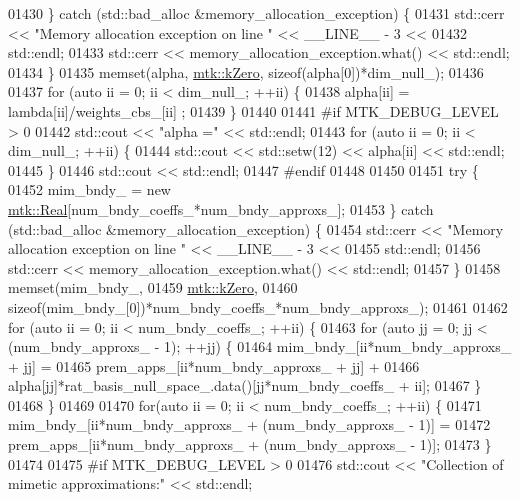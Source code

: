 \begin{DoxyCode}
{{01430   \} \textcolor{keywordflow}{catch} (std::bad\_alloc &memory\_allocation\_exception) \{
01431     std::cerr << \textcolor{stringliteral}{"Memory allocation exception on line "} << \_\_LINE\_\_ - 3 <<
01432       std::endl;
01433     std::cerr << memory\_allocation\_exception.what() << std::endl;
01434   \}
01435   memset(alpha, \hyperlink{group__c01-roots_ga59a451a5fae30d59649bcda274fea271}{mtk::kZero}, \textcolor{keyword}{sizeof}(alpha[0])*dim\_null\_);
01436 
01437   \textcolor{keywordflow}{for} (\textcolor{keyword}{auto} ii = 0; ii < dim\_null\_; ++ii) \{
01438     alpha[ii] = lambda[ii]/weights\_cbs\_[ii] ;
01439   \}
01440 
01441 \textcolor{preprocessor}{  #if MTK\_DEBUG\_LEVEL > 0}
01442   std::cout << \textcolor{stringliteral}{"alpha ="} << std::endl;
01443   \textcolor{keywordflow}{for} (\textcolor{keyword}{auto} ii = 0; ii < dim\_null\_; ++ii) \{
01444     std::cout << std::setw(12) << alpha[ii] << std::endl;
01445   \}
01446   std::cout << std::endl;
01447 \textcolor{preprocessor}{  #endif}
01448 
01450 
01451   \textcolor{keywordflow}{try} \{
01452     mim\_bndy\_ = \textcolor{keyword}{new} \hyperlink{group__c01-roots_gac080bbbf5cbb5502c9f00405f894857d}{mtk::Real}[num\_bndy\_coeffs\_*num\_bndy\_approxs\_];
01453   \} \textcolor{keywordflow}{catch} (std::bad\_alloc &memory\_allocation\_exception) \{
01454     std::cerr << \textcolor{stringliteral}{"Memory allocation exception on line "} << \_\_LINE\_\_ - 3 <<
01455       std::endl;
01456     std::cerr << memory\_allocation\_exception.what() << std::endl;
01457   \}
01458   memset(mim\_bndy\_,
01459          \hyperlink{group__c01-roots_ga59a451a5fae30d59649bcda274fea271}{mtk::kZero},
01460          \textcolor{keyword}{sizeof}(mim\_bndy\_[0])*num\_bndy\_coeffs\_*num\_bndy\_approxs\_);
01461 
01462   \textcolor{keywordflow}{for} (\textcolor{keyword}{auto} ii = 0; ii < num\_bndy\_coeffs\_; ++ii) \{
01463     \textcolor{keywordflow}{for} (\textcolor{keyword}{auto} jj = 0; jj < (num\_bndy\_approxs\_ - 1); ++jj) \{
01464       mim\_bndy\_[ii*num\_bndy\_approxs\_ + jj] =
01465         prem\_apps\_[ii*num\_bndy\_approxs\_ + jj] +
01466         alpha[jj]*rat\_basis\_null\_space\_.data()[jj*num\_bndy\_coeffs\_ + ii];
01467     \}
01468   \}
01469 
01470   \textcolor{keywordflow}{for}(\textcolor{keyword}{auto} ii = 0; ii < num\_bndy\_coeffs\_; ++ii) \{
01471     mim\_bndy\_[ii*num\_bndy\_approxs\_ + (num\_bndy\_approxs\_ - 1)] =
01472       prem\_apps\_[ii*num\_bndy\_approxs\_ + (num\_bndy\_approxs\_ - 1)];
01473   \}
01474 
01475 \textcolor{preprocessor}{  #if MTK\_DEBUG\_LEVEL > 0}
01476   std::cout << \textcolor{stringliteral}{"Collection of mimetic approximations:"} << std::endl;
}}
\end{DoxyCode}

